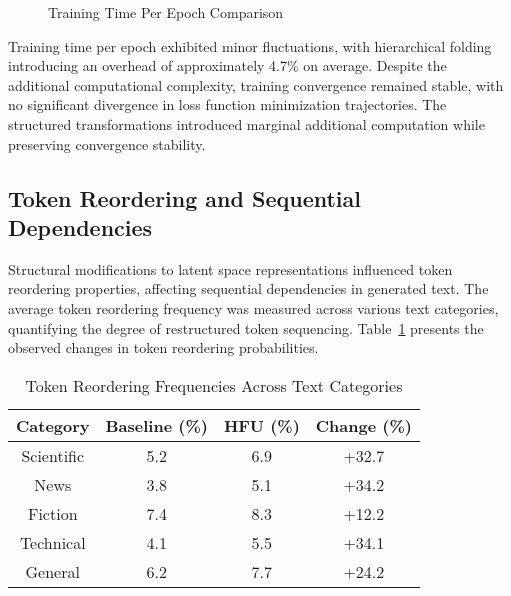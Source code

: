 \documentclass[5p,times]{elsarticle}
\begin{document}
\begin{figure*}[h]
	\centering
	\caption{Training Time Per Epoch Comparison}
	\label{fig:training_time}
\end{figure*}

Training time per epoch exhibited minor fluctuations, with hierarchical folding introducing an overhead of approximately 4.7\% on average. Despite the additional computational complexity, training convergence remained stable, with no significant divergence in loss function minimization trajectories. The structured transformations introduced marginal additional computation while preserving convergence stability.

\subsection{Token Reordering and Sequential Dependencies}

Structural modifications to latent space representations influenced token reordering properties, affecting sequential dependencies in generated text. The average token reordering frequency was measured across various text categories, quantifying the degree of restructured token sequencing. Table~\ref{tab:token_reordering} presents the observed changes in token reordering probabilities.

\begin{table}[h]
	\centering
	\caption{Token Reordering Frequencies Across Text Categories}
	\label{tab:token_reordering}
	\begin{tabular}{|c|c|c|c|}
		\hline
		Category & Baseline (\%) & HFU (\%) & Change (\%) \\
		\hline
		Scientific & 5.2 & 6.9 & +32.7 \\
		News & 3.8 & 5.1 & +34.2 \\
		Fiction & 7.4 & 8.3 & +12.2 \\
		Technical & 4.1 & 5.5 & +34.1 \\
		General & 6.2 & 7.7 & +24.2 \\
		\hline
	\end{tabular}
\end{table}
\end{document}
